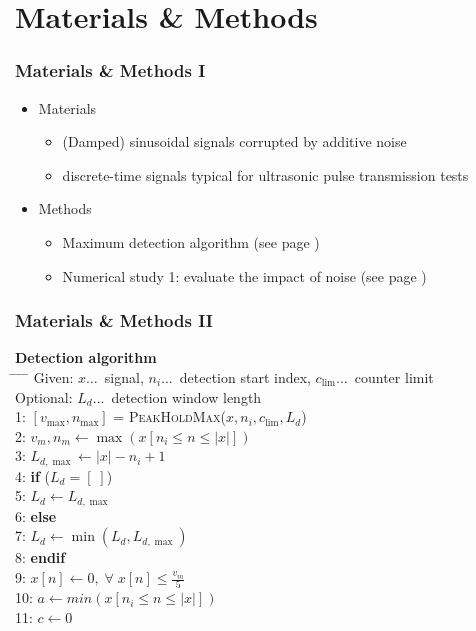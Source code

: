 \documentclass[11pt,aspectratio=169]{beamer}
\begin{document}
	\section{Materials \& Methods}
	\begin{frame}
		\frametitle{Materials \& Methods I}
		\begin{itemize}
			\setlength\itemsep{0.5em}
			\item \textcolor{RIPtitlecol}{Materials}
			\begin{itemize}
				\setlength\itemsep{0.5em}
				\item (Damped) sinusoidal signals corrupted by additive noise
				\item discrete-time signals typical for ultrasonic pulse transmission tests
			\end{itemize}
			\item \textcolor{RIPtitlecol}{Methods}
			\begin{itemize}
				\setlength\itemsep{0.5em}
				\item Maximum detection algorithm (see page \pageref{algo:detection})
				\item Numerical study 1: evaluate the impact of noise (see page \pageref{algo:detection})
			\end{itemize}
		\end{itemize}
	\end{frame}
	\begin{frame}
		\frametitle{Materials \& Methods II}
		\small
		\begin{tabbing}
			\textbf{Detection algorithm}\label{algo:detection} \\
			\hspace{0.4cm} \= \hspace{0.4cm} \= \hspace{0.4cm} \= \hspace{0.5cm} \= \kill
			 \> Given: $x \ldots$~signal, $n_i \ldots$~detection start index, $c_{\lim} \ldots$~counter limit \\
			 \> Optional: $L_d \ldots$~detection window length \\
			 1: \> $[v_{\max}, n_{\max}]$ = \textsc{PeakHoldMax}($x, n_i, c_{\lim}, L_d$) \\
			 2: \> \> $v_m, n_m \gets \max(x[n_i \leq n \leq |x|])$ \\
			 3: \> \> $L_{d,\max} \gets |x| - n_i + 1$ \\
			 4: \> \> \textbf{if} ($L_d = [\;]$) \\
			 5: \> \> \> $L_d \gets L_{d,\max}$ \\
			 6: \> \> \textbf{else} \\
			 7: \> \> \> $L_d \gets \min(L_d, L_{d,\max})$ \\
			 8: \> \> \textbf{endif} \\
			 9: \> \> $x[n] \gets 0, \; \forall \; x[n] \leq \frac{v_m}{5}$ \\
			 10: \> \> $a \gets min(x[n_i \leq n \leq |x|])$ \\
			 11: \> \> $c \gets 0$ \\
		\end{tabbing}
	\end{frame}
\end{document}
